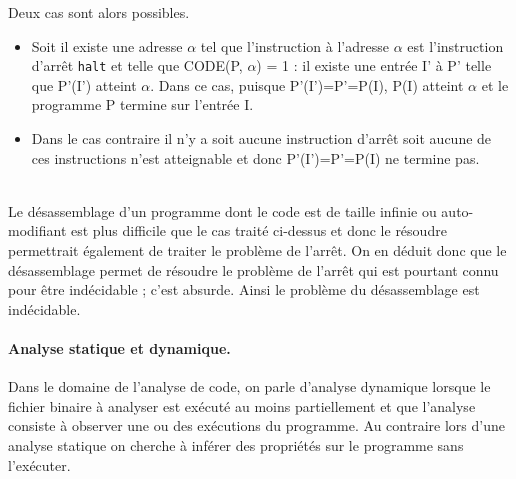 
Deux cas sont alors possibles.
\begin{itemize}
 \item Soit il existe une adresse $\alpha$ tel que l'instruction à l'adresse $\alpha$ est l'instruction d'arrêt \texttt{halt} et telle que CODE(P, $\alpha$) = 1 : il existe une entrée I' à P' telle que P'(I') atteint $\alpha$. Dans ce cas, puisque P'(I')=P'=P(I), P(I) atteint $\alpha$ et le programme P termine sur l'entrée I.
 \item Dans le cas contraire il n'y a soit aucune instruction d'arrêt soit aucune de ces instructions n'est atteignable et donc P'(I')=P'=P(I) ne termine pas.
\end{itemize}
~\\
Le désassemblage d'un programme dont le code est de taille infinie ou auto-modifiant est plus difficile que le cas traité ci-dessus et donc le résoudre permettrait également de traiter le problème de l'arrêt.
On en déduit donc que le désassemblage permet de résoudre le problème de l'arrêt qui est pourtant connu pour être indécidable ; c'est absurde.
Ainsi le problème du désassemblage est indécidable.


\paragraph{Analyse statique et dynamique.}
Dans le domaine de l'analyse de code, on parle d'analyse dynamique lorsque le fichier binaire à analyser est exécuté au moins partiellement et que l'analyse consiste à observer une ou des exécutions du programme. Au contraire lors d'une analyse statique on cherche à inférer des propriétés sur le programme sans l'exécuter.

